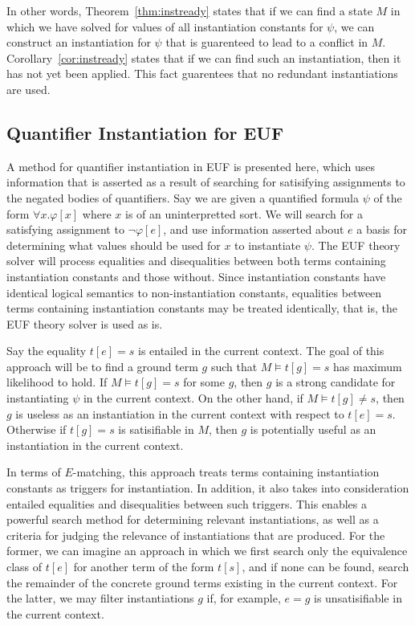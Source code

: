\documentclass{llncs}
\begin{document}
In other words, Theorem~\ref{thm:instready} states that if we can find a state $M$ in which we have solved for values of all instantiation constants for $\psi$, we can construct an instantiation for $\psi$ that is guarenteed to lead to a conflict in $M$.
Corollary~\ref{cor:instready} states that if we can find such an instantiation, then it has not yet been applied.
This fact guarentees that no redundant instantiations are used.

\subsection{Quantifier Instantiation for EUF}

A method for quantifier instantiation in EUF is presented here, which uses information that is asserted as a result of searching for satisifying assignments to the negated bodies of quantifiers.
Say we are given a quantified formula $\psi$ of the form $\forall x. \varphi[x]$ where $x$ is of an uninterpretted sort.
We will search for a satisfying assignment to $\neg \varphi[e]$, and use information asserted about $e$ a basis for determining what values should be used for $x$ to instantiate $\psi$.
The EUF theory solver will process equalities and disequalities between both terms containing instantiation constants and those without.
Since instantiation constants have identical logical semantics to non-instantiation constants, equalities between terms containing instantiation constants may be treated identically, that is, the EUF theory solver is used as is.

Say the equality $t[e] = s$ is entailed in the current context.
The goal of this approach will be to find a ground term $g$ such that $M \models t[g] = s$ has maximum likelihood to hold.
If $M \models t[g] = s$ for some $g$, then $g$ is a strong candidate for instantiating $\psi$ in the current context.
On the other hand, if $M \models t[g] \neq s$, then $g$ is useless as an instantiation in the current context with respect to $t[e] = s$.
Otherwise if $t[g] = s$ is satisifiable in $M$, then $g$ is potentially useful as an instantiation in the current context.

In terms of $E$-matching, this approach treats terms containing instantiation constants as triggers for instantiation.
In addition, it also takes into consideration entailed equalities and disequalities between such triggers.
This enables a powerful search method for determining relevant instantiations, as well as a criteria for judging the relevance of instantiations that are produced.
For the former, we can imagine an approach in which we first search only the equivalence class of $t[e]$ for another term of the form $t[s]$, and if none can be found, search the remainder of the concrete ground terms existing in the current context.
For the latter, we may filter instantiations $g$ if, for example, $e = g$ is unsatisifiable in the current context.
\end{document}
